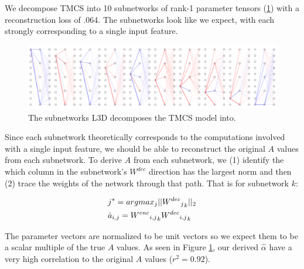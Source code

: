 \documentclass{article}
\theoremstyle{plain}
\theoremstyle{definition}
\theoremstyle{remark}
\begin{document}
We decompose TMCS into 10 subnetworks of rank-1 parameter tensors (\ref{fig:5_circuit_superposition_decomposition}) with a reconstruction loss of .064. The subnetworks look like we expect, with each strongly corresponding to a single input feature.


\begin{figure}[htbp]
    \centerline{\includegraphics[width=\textwidth]{../figures/5_circuit_superposition_decomposition.pdf}}
    \centering
    \caption{The subnetworks L3D decomposes the TMCS model into.}\label{fig:5_circuit_superposition_decomposition}
\end{figure}


Since each subnetwork theoretically corresponds to the computations involved with a single input feature, we should be able to reconstruct the original $A$ values from each subnetwork. To derive $A$ from each subnetwork, we (1) identify the which column in the subnetwork's $W^{dec}$ direction has the largest norm and then (2) trace the weights of the network through that path. That is for subnetwork $k$: 

\begin{align}
    &j^* = argmax_{j} ||{{{W^{dec}}_j}_k}||_2 \\
    &\hat{a}_{i,j} = {{{W^{enc}}_{i,j}}}_k {{W^{dec}}_{i,j}}_k \notag
\end{align}

The parameter vectors are normalized to be unit vectors so we expect them to be a scalar multiple of the true $A$ values. As seen in Figure \ref{fig:5_circuit_superposition_decomposition}, our derived $\hat{\alpha}$ have a very high correlation to the original $A$ values ($r^2 = 0.92$).
\end{document}
